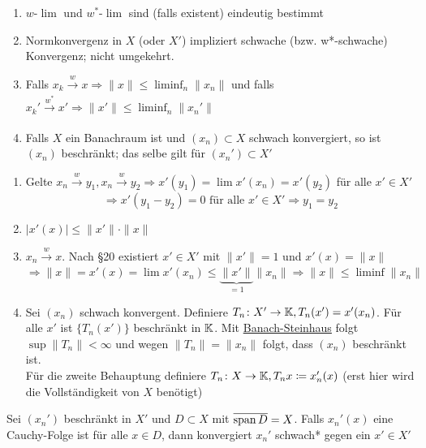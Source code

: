 \begin{eig}
	\begin{enumerate}[label=\alph*\upshape)]
		\item $w$-$\lim$ und $w^{*}$-$\lim$ sind (falls existent) eindeutig bestimmt
		\item Normkonvergenz in $X$ (oder $X'$) impliziert schwache (bzw. w*-schwache) Konvergenz; nicht umgekehrt.
		\item Falls $x_{k} \xrightarrow[]{w} x \Rightarrow \| x \| \leq \liminf_{n} \| x_{n} \|$ und falls $x_{k}' \xrightarrow[]{w^{*}} x' \Rightarrow \| x' \| \leq \liminf_{n} \| x_{n}' \|$ 
		\item Falls $X$ ein Banachraum ist und $(x_{n}) \subset X$ schwach konvergiert, so ist $(x_{n})$ beschränkt; das selbe gilt für $(x_{n}') \subset X'$
	\end{enumerate}	
\end{eig}

\newpage %

\begin{beweis}
	\begin{enumerate}[label=\alph*\upshape)]
		\item Gelte $x_{n} \xrightarrow[]{w} y_{1}, x_{n} \xrightarrow[]{w} y_{2} \Rightarrow x'(y_{1}) = \lim x'(x_{n}) = x'(y_{2})$ für alle $x' \in X'$
			\[ \Rightarrow x'(y_{1} - y_{2}) = 0 \text{ für alle } x' \in X' \Rightarrow y_{1} = y_{2} \]
		\item $| x'(x) | \leq \| x' \| \cdot \| x \|$
		\item $x_{n} \xrightarrow[]{w} x$. Nach \S 20 existiert $x' \in X'$ mit $\| x' \| = 1$ und $x'(x) = \| x \|$
			\[ \Rightarrow \| x \| = x'(x) = \lim x'(x_{n}) \leq \underbrace{\| x' \|}_{= 1} \| x_{n} \| \Rightarrow \| x \| \leq \liminf \| x_{n} \| \]
		\item Sei $(x_{n})$ schwach konvergent. Definiere $T_{n} \colon X' \rightarrow \mathbb{K}, T_{n}(x') = x'(x_{n})$. Für alle $x'$ ist $\{ T_{n}(x') \}$ beschränkt in $\mathbb{K}$. Mit \hyperref[satz:9.5-Banach-Steinhaus]{Banach-Steinhaus} folgt $\sup \| T_{n} \| < \infty$ und wegen $\| T_{n} \| = \| x_{n} \|$ folgt, dass $(x_{n})$ beschränkt ist. \\
			Für die zweite Behauptung definiere $T_{n} \colon X \rightarrow \mathbb{K}, T_{n} x \coloneqq x_{n}'(x)$ (erst hier wird die Vollständigkeit von $X$ benötigt)
	\end{enumerate}		
\end{beweis}


\begin{lemma}
	Sei $(x_{n}')$ beschränkt in $X'$ und $D \subset X$ mit $\overline{\operatorname{span} D} = X$. Falls $x_{n}'(x)$ eine Cauchy-Folge ist für alle $x \in D$, dann konvergiert $x_{n}'$ schwach* gegen ein $x' \in X'$
\end{lemma}

